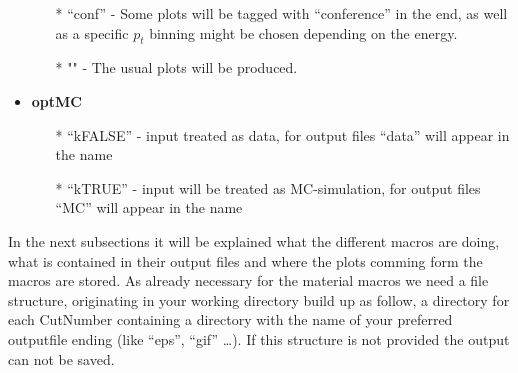\begin{itemize}
\begin{itemize}
 				\item [*] ``conf''  - Some plots will be tagged with ``conference'' in the end, as well as a specific $p_t$ binning might be chosen depending on the energy.
				\item [*] ""	- The usual plots will be produced. 
				\end{itemize}
			 \item \textbf{optMC}
				\begin{itemize}
 				\item [*] ``kFALSE''    - input treated as data, for output files ``data'' will appear in the name
				\item [*] ``kTRUE''     - input will be treated as MC-simulation, for output files ``MC'' will appear in the name
				\end{itemize}
			\end{itemize}
		In the next subsections it will be explained what the different macros are doing, what is contained in their output files and where the plots comming form the macros are stored. As already necessary for the material macros we need a file structure, originating in your working directory build up as follow, a directory for each CutNumber containing a directory with the name of your preferred outputfile ending (like ``eps'', ``gif'' \ldots). If this structure is not provided the output can not be saved.
			
